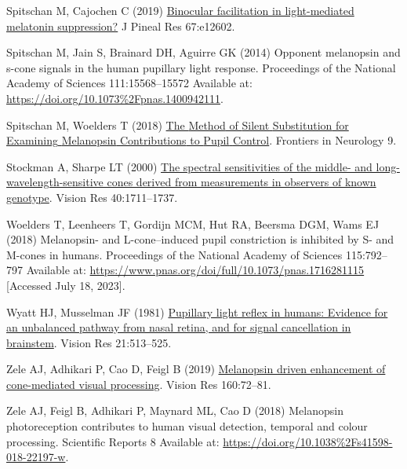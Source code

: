 \documentclass[
]{article}
\newlength{\cslhangindent}
\newenvironment{CSLReferences}[2] %
 {\begin{list}{}{%
  \setlength{\itemindent}{0pt}
  \setlength{\leftmargin}{0pt}
  \setlength{\parsep}{0pt}
  \ifodd #1
   \setlength{\leftmargin}{\cslhangindent}
   \setlength{\itemindent}{-1\cslhangindent}
  \fi
  \setlength{\itemsep}{#2\baselineskip}}}
 {\end{list}}
\begin{document}
\begin{CSLReferences}{1}{1}
Spitschan M, Cajochen C (2019) \href{https://doi.org/10.1111/jpi.12602}{Binocular facilitation in light-mediated melatonin suppression?} J Pineal Res 67:e12602.

Spitschan M, Jain S, Brainard DH, Aguirre GK (2014) Opponent melanopsin and s-cone signals in the human pupillary light response. Proceedings of the National Academy of Sciences 111:15568--15572 Available at: \url{https://doi.org/10.1073\%2Fpnas.1400942111}.

Spitschan M, Woelders T (2018) \href{https://doi.org/10.3389/fneur.2018.00941}{The {Method} of {Silent} {Substitution} for {Examining} {Melanopsin} {Contributions} to {Pupil} {Control}}. Frontiers in Neurology 9.

Stockman A, Sharpe LT (2000) \href{https://doi.org/10.1016/s0042-6989(00)00021-3}{The spectral sensitivities of the middle- and long-wavelength-sensitive cones derived from measurements in observers of known genotype}. Vision Res 40:1711--1737.

Woelders T, Leenheers T, Gordijn MCM, Hut RA, Beersma DGM, Wams EJ (2018) Melanopsin- and {L}-cone--induced pupil constriction is inhibited by {S}- and {M}-cones in humans. Proceedings of the National Academy of Sciences 115:792--797 Available at: \url{https://www.pnas.org/doi/full/10.1073/pnas.1716281115} {[}Accessed July 18, 2023{]}.

Wyatt HJ, Musselman JF (1981) \href{https://doi.org/10.1016/0042-6989(81)90097-3}{Pupillary light reflex in humans: Evidence for an unbalanced pathway from nasal retina, and for signal cancellation in brainstem}. Vision Res 21:513--525.

Zele AJ, Adhikari P, Cao D, Feigl B (2019) \href{https://doi.org/10.1016/j.visres.2019.04.009}{Melanopsin driven enhancement of cone-mediated visual processing}. Vision Res 160:72--81.

Zele AJ, Feigl B, Adhikari P, Maynard ML, Cao D (2018) Melanopsin photoreception contributes to human visual detection, temporal and colour processing. Scientific Reports 8 Available at: \url{https://doi.org/10.1038\%2Fs41598-018-22197-w}.

\end{CSLReferences}
\end{document}
